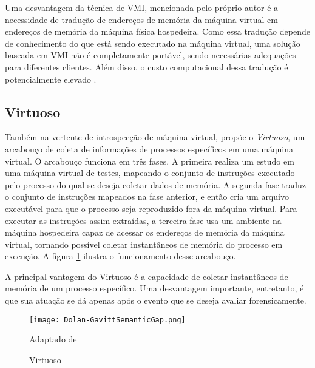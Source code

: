 Uma desvantagem da técnica de VMI, mencionada pelo próprio autor  é a necessidade de tradução de endereços de memória da máquina virtual em endereços de memória da máquina física hospedeira.
%
Como essa tradução depende de conhecimento do que está sendo executado na máquina virtual, uma solução baseada em VMI não é completamente portável, sendo necessárias adequações para diferentes clientes.
%
Além disso, o custo computacional dessa tradução é potencialmente elevado .
%

\subsection{Virtuoso}
\label{sec:virtuoso}

Também na vertente de introspecção de máquina virtual, \cite{Dolan-GavittSemanticGap:2011} propõe o \textit{Virtuoso}, um arcabouço de coleta de informações de processos específicos em uma máquina virtual.
%
O arcabouço funciona em três fases.
%
A primeira realiza um estudo em uma máquina virtual de testes, mapeando o conjunto de instruções executado pelo processo do qual se deseja coletar dados de memória. 
%
A segunda fase traduz o conjunto de instruções mapeados na fase anterior, e então cria um arquivo executável para que o processo seja reproduzido fora da máquina virtual.
%
Para executar as instruções assim extraídas, a terceira fase usa um ambiente na máquina hospedeira capaz de acessar os endereços de memória da máquina virtual, tornando possível coletar instantâneos de memória do processo em execução.
%
A figura \ref{fig:Dolan-GavittSemanticGap} ilustra o funcionamento desse arcabouço. 


A principal vantagem do Virtuoso é a capacidade de coletar instantâneos de memória de um processo específico.
%
Uma desvantagem importante, entretanto, é que sua atuação se dá apenas após o evento que se deseja avaliar forensicamente.
%


\begin{figure}[htb!]
\footnotesize
\caption{Virtuoso}
\texttt{[image: Dolan-GavittSemanticGap.png]}
\centering
\label{fig:Dolan-GavittSemanticGap}
\begin{center}
Adaptado de \cite{Dolan-GavittSemanticGap:2011} 
\end{center}
\end{figure}


